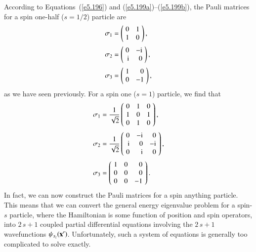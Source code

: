 According to Equations~(\ref{e5.196}) and (\ref{e5.199a})--(\ref{e5.199b}), the Pauli matrices for a spin one-half 
($s=1/2$)
particle are 
\begin{align}
\sigma_1 &= \left(\!\begin{array}{rr} 0 &1\\1&0\end{array}\!\right),\\[0.5ex]
\sigma_2 &= \left(\!\begin{array}{rr} 0 &-{\rm i}\\{\rm i}&0\end{array}\!\right),\\[0.5ex]
\sigma_3 &= \left(\!\begin{array}{rr} 1 &0\\0&-1\end{array}\!\right),
\end{align}
as we have seen previously. For a spin one ($s=1$) particle, we find that
\begin{align}
\sigma_1 &=\frac{1}{\sqrt{2}}\left(\!
\begin{array}{rrr} 0 &1&0\\1&0&1\\0&1&0\end{array}\!\right),\\[0.5ex]
\sigma_2 &= \frac{1}{\sqrt{2}}
\left(\!\begin{array}{rrr} 0 &-{\rm i}&0\\{\rm i}&0&{-\rm i}\\
0&{\rm i}& 0\end{array}\!\right),\\[0.5ex]
\sigma_3 &= \left(\!\begin{array}{rrr} 1 &0&0\\0&0&0\\0&0&-1\end{array}\!\right).
\end{align}
In fact, we can now construct the Pauli matrices for a spin anything particle. 
This means that we can convert the general energy eigenvalue problem for a spin-$s$ particle, where the Hamiltonian is some function of position and spin operators,
into $2\,s+1$ coupled partial differential equations involving the 
$2\,s+1$ wavefunctions
$\psi_{s_z}({\bf x'})$. Unfortunately, such a system
of equations is generally too complicated
to solve exactly.

